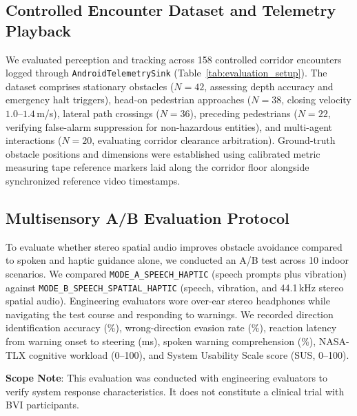 \subsection{Controlled Encounter Dataset and Telemetry Playback}
We evaluated perception and tracking across 158 controlled corridor encounters logged through \texttt{AndroidTelemetrySink} (Table~\ref{tab:evaluation_setup}). The dataset comprises stationary obstacles ($N=42$, assessing depth accuracy and emergency halt triggers), head-on pedestrian approaches ($N=38$, closing velocity $1.0\text{--}1.4$\,m/s), lateral path crossings ($N=36$), preceding pedestrians ($N=22$, verifying false-alarm suppression for non-hazardous entities), and multi-agent interactions ($N=20$, evaluating corridor clearance arbitration). Ground-truth obstacle positions and dimensions were established using calibrated metric measuring tape reference markers laid along the corridor floor alongside synchronized reference video timestamps.

\subsection{Multisensory A/B Evaluation Protocol}
To evaluate whether stereo spatial audio improves obstacle avoidance compared to spoken and haptic guidance alone, we conducted an A/B test across 10 indoor scenarios. We compared \texttt{MODE\_A\_SPEECH\_HAPTIC} (speech prompts plus vibration) against \texttt{MODE\_B\_SPEECH\_SPATIAL\_HAPTIC} (speech, vibration, and 44.1\,kHz stereo spatial audio). Engineering evaluators wore over-ear stereo headphones while navigating the test course and responding to warnings. We recorded direction identification accuracy (\%), wrong-direction evasion rate (\%), reaction latency from warning onset to steering (ms), spoken warning comprehension (\%), NASA-TLX cognitive workload (0--100), and System Usability Scale score (SUS, 0--100).

\textbf{Scope Note}: This evaluation was conducted with engineering evaluators to verify system response characteristics. It does not constitute a clinical trial with BVI participants.
